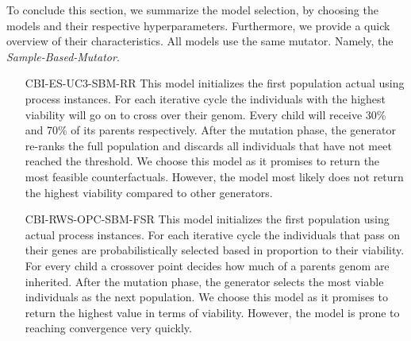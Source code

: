 \documentclass[./../../paper.tex]{subfiles}
\begin{document}
To conclude this section, we summarize the model selection, by choosing the models and their respective hyperparameters. Furthermore, we provide a quick overview of their characteristics. All models use the same mutator. Namely, the \emph{Sample-Based-Mutator}. 


\begin{enumerate}
    \item[CBI-ES-UC3-SBM-RR] This model initializes the first population actual using process instances. For each iterative cycle the individuals with the highest viability will go on to cross over their genom. Every child will receive 30\% and 70\% of its parents respectively. After the mutation phase, the generator re-ranks the full population and discards all individuals that have not meet reached the threshold. We choose this model as it promises to return the most feasible counterfactuals. However, the model most likely does not return the highest viability compared to other generators.
    \item[CBI-RWS-OPC-SBM-FSR] This model initializes the first population using actual process instances. For each iterative cycle the individuals that pass on their genes are probabilistically selected based in proportion to their viability. For every child a crossover point decides how much of a parents genom are inherited. After the mutation phase, the generator selects the most viable individuals as the next population. We choose this model as it promises to return the highest value in terms of viability. However, the model is prone to reaching convergence very quickly.  
\end{enumerate}

\end{document}

